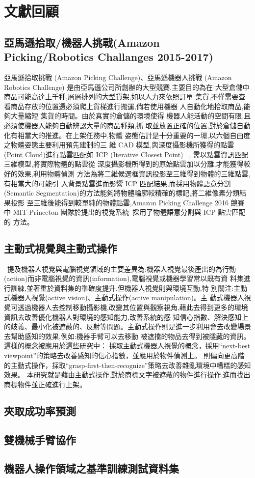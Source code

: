 \chapter{文獻回顧}
\label{chapter:relate-work}

\section{亞馬遜拾取/機器人挑戰(Amazon Picking/Robotics Challanges 2015-2017)}
亞馬遜拾取挑戰 (Amazon Picking Challenge)、亞馬遜機器人挑戰 (Amazon
Robotics Challenge) 是由亞馬遜公司所創辦的大型競賽,主要目的為在
大型倉儲中商品可能高達上千種,層層排列的大型貨架,如以人力來依照訂單
集貨,不僅需要查看商品存放的位置還必須爬上貨梯進行搬運,倘若使用機器
人自動化地拾取商品,能夠大量縮短 集貨的時間。由於真實的倉儲的環境使得
機器人能活動的空間有限,且必須使機器人能夠自動辨認大量的商品種類,抓
取並放置正確的位置,對於倉儲自動化有相當大的推進。在上架任務中,物體
姿態估計是十分重要的一環,以六個自由度之物體姿態主要利用預先建制的三
維 CAD 模型,與深度攝影機所獲得的點雲(Point Cloud)進行點雲匹配如 ICP
(Iterative Closest Point) ~\cite{pomerleau2013comparing},
需以點雲資訊匹配三維模型,將實際物體的點雲從
深度攝影機所得到的原始點雲加以分離,才能獲得較好的效果,利用物體偵測
方法為將二維候選框資訊投影至三維得到物體的三維點雲,有相當大的可能引
入背景點雲進而影響 ICP 匹配結果,而採用物體語意分割(Semantic
Segmentation)的方法能夠將物體輪廓較精確的標記,將二維像素分類結果投影
至三維後能得到較單純的物體點雲,Amazon Picking Challenge 2016 競賽中
MIT-Princeton 團隊於提出的視覺系統~\cite{zeng2016multi}採用了物體語意分割與 ICP 點雲匹配的
方法。

\section{主動式視覺與主動式操作}
~\cite{sunderhauf2018limits}提及機器人視覺與電腦視覺領域的主要差異為:機器人視覺最後產出的為行動
(action)而非電腦視覺的資訊(information),電腦視覺或機器學習常以既有資
料集進行訓練,並著重於資料集的準確度提升,但機器人視覺則與環境互動,特
別關注:主動式機器人視覺(active vision)、主動式操作(active manipulation)。主
動式機器人視覺可透過機器人去控制移動攝影機,改變其位置與觀察視角,藉此去得到更多的環境資訊去改善優化機器人對環境的感知能力,改善系統的感
知信心指數、解決感知上的歧義、最小化被遮蔽的、反射等問題。主動式操作則是進一步利用會去改變場景去幫助感知的效果,例如:機器手臂可以去移動
被遮擋的物品去得到被隱藏的資訊。
這樣的概念被應用於這些研究中： \cite{atanasov2014nonmyopic} \cite{doumanoglou2016recovering} \cite{malmir2017deep}採取主動式機器人視覺的概念，採用``next-best viewpoint''的策略去改善感知的信心指數，並應用於物件偵測上。
 \cite{zeng2018robotic} 則偏向更高階的主動式操作，採取``grasp-first-then-recognize''策略去改善雜亂環境中糟糕的感知效果。
本研究就是藉由主動式操作,對於商標文字被遮蔽的物件進行操作,進而找出商標物件並正確進行上架。



\section{夾取成功率預測}

\section{雙機械手臂協作}

\section{機器人操作領域之基準訓練測試資料集}
